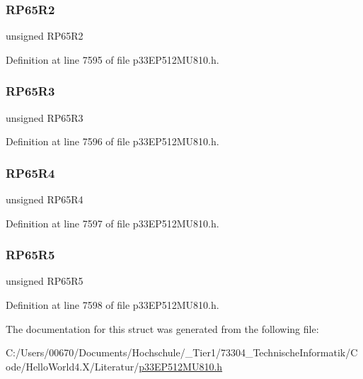 \subsubsection{\texorpdfstring{R\+P65\+R2}{RP65R2}}
{\footnotesize\ttfamily unsigned R\+P65\+R2}



Definition at line 7595 of file p33\+E\+P512\+M\+U810.\+h.

\mbox{\label{structtag_r_p_o_r0_b_i_t_s_a7c00a440bb71b1b9d66a20cb797a1082}} 
\subsubsection{\texorpdfstring{R\+P65\+R3}{RP65R3}}
{\footnotesize\ttfamily unsigned R\+P65\+R3}



Definition at line 7596 of file p33\+E\+P512\+M\+U810.\+h.

\mbox{\label{structtag_r_p_o_r0_b_i_t_s_aca01132661ce2b0aefe4975e2084376f}} 
\subsubsection{\texorpdfstring{R\+P65\+R4}{RP65R4}}
{\footnotesize\ttfamily unsigned R\+P65\+R4}



Definition at line 7597 of file p33\+E\+P512\+M\+U810.\+h.

\mbox{\label{structtag_r_p_o_r0_b_i_t_s_ad52150a6d20d36a5d2a3e63ccadd3932}} 
\subsubsection{\texorpdfstring{R\+P65\+R5}{RP65R5}}
{\footnotesize\ttfamily unsigned R\+P65\+R5}



Definition at line 7598 of file p33\+E\+P512\+M\+U810.\+h.



The documentation for this struct was generated from the following file\+:\begin{DoxyCompactItemize}
\item 
C\+:/\+Users/00670/\+Documents/\+Hochschule/\+\_\+\+Tier1/73304\+\_\+\+Technische\+Informatik/\+Code/\+Hello\+World4.\+X/\+Literatur/\hyperlink{p33_e_p512_m_u810_8h}{p33\+E\+P512\+M\+U810.\+h}\end{DoxyCompactItemize}
